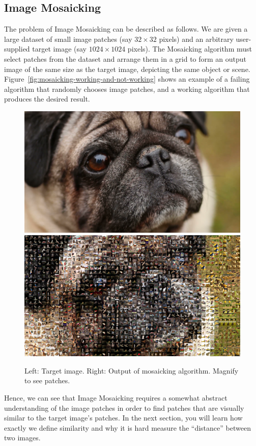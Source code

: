 \documentclass[a4paper]{article}
\begin{document}
	\subsection{Image Mosaicking}
		The problem of Image Mosaicking can be described as follows.
		We are given a large dataset of small image patches (say $32 \times 32$ pixels) and an arbitrary user-supplied target image (say $1024 \times 1024$ pixels).
		The Mosaicking algorithm must select patches from the dataset and arrange them in a grid to form an output image of the same size as the target image, depicting the same object or scene.
		Figure~\ref{fig:mosaicking-working-and-not-working} shows an example of a failing algorithm that randomly chooses image patches, and a working algorithm that produces the desired result.
		\begin{figure}
			\centering
			\includegraphics[width=0.45\linewidth]{dog1}
			\includegraphics[width=0.45\linewidth]{mosaic-dog1-nearest}
			\caption{
				Left: Target image. 
				Right: Output of mosaicking algorithm. 
				Magnify to see patches.
			}
			\label{fig:mosaic-dog1-nearest}
		\end{figure}
		Hence, we can see that Image Mosaicking requires a somewhat abstract understanding of the image patches in order to find patches that are visually similar to the target image's patches.
		In the next section, you will learn how exactly we define similarity and why it is hard measure the ``distance'' between two images.
		
\end{document}
